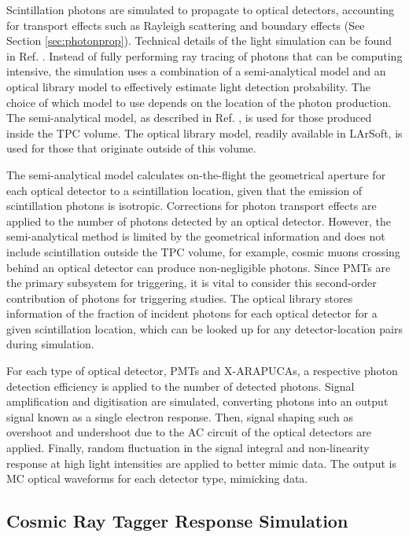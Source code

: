 Scintillation photons are simulated to propagate to optical detectors, accounting for transport effects such as Rayleigh scattering and boundary effects (See Section \ref{sec:photonprop}).
Technical details of the light simulation can be found in Ref. \cite{sbnd_pds_paper}.
Instead of fully performing ray tracing of photons that can be computing intensive, the simulation uses a combination of a semi-analytical model and an optical library model to effectively estimate light detection probability. 
The choice of which model to use depends on the location of the photon production.
The semi-analytical model, as described in Ref. \cite{pds_sim}, is used for those produced inside the TPC volume.
The optical library model, readily available in LArSoft, is used for those that originate outside of this volume.

The semi-analytical model calculates on-the-flight the geometrical aperture for each optical detector to a scintillation location, given that the emission of scintillation photons is isotropic.
Corrections for photon transport effects are applied to the number of photons detected by an optical detector.
However, the semi-analytical method is limited by the geometrical information and does not include scintillation outside the TPC volume, for example, cosmic muons crossing behind an optical detector can produce non-negligible photons.
Since PMTs are the primary subsystem for triggering, it is vital to consider this second-order contribution of photons for triggering studies.
The optical library stores information of the fraction of incident photons for each optical detector for a given scintillation location, which can be looked up for any detector-location pairs during 
simulation. 

For each type of optical detector, PMTs and X-ARAPUCAs, a respective photon detection efficiency is applied to the number of detected photons.
Signal amplification and digitisation are simulated, converting photons into an output signal known as a single electron response.
Then, signal shaping such as overshoot and undershoot due to the AC circuit of the optical detectors are applied.
Finally, random fluctuation in the signal integral and non-linearity response at high light intensities are applied to better mimic data.
The output is MC optical waveforms for each detector type, mimicking data. 

\subsection{Cosmic Ray Tagger Response Simulation}
\label{sec:crt_response}

